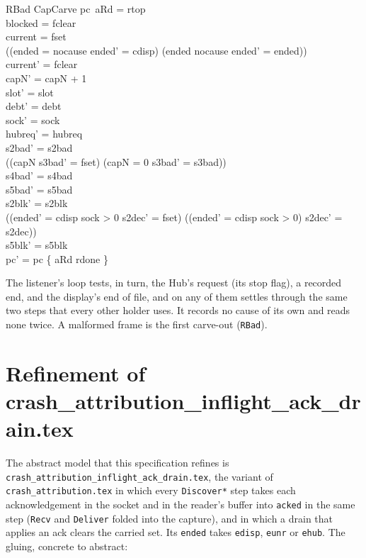 \documentclass[a4paper,10pt,fleqn]{article}
\begin{document}
\begin{schema}{RBad}
  CapCarve
\where
  pc~aRd = rtop \\
  blocked = fclear \\
  current = fset \\
  ((ended = nocause \land ended' = cdisp) \lor (ended \neq nocause \land ended' = ended)) \\
  current' = fclear \\
  capN' = capN + 1 \\
  slot' = slot \\
  debt' = debt \\
  sock' = sock \\
  hubreq' = hubreq \\
  s2bad' = s2bad \\
  ((capN  \land s3bad' = fset) \lor (capN = 0 \land s3bad' = s3bad)) \\
  s4bad' = s4bad \\
  s5bad' = s5bad \\
  s2blk' = s2blk \\
  ((ended' = cdisp \land sock > 0 \land s2dec' = fset) \lor
    (\lnot (ended' = cdisp \land sock > 0) \land s2dec' = s2dec)) \\
  s5blk' = s5blk \\
  pc' = pc \oplus \{ aRd \mapsto rdone \}
\end{schema}

The listener's loop tests, in turn, the Hub's request (its stop flag), a
recorded end, and the display's end of file, and on any of them settles through
the same two steps that every other holder uses.  It records no cause of its
own and reads none twice.  A malformed frame is the first carve-out
(\texttt{RBad}).

\section{Refinement of crash\_attribution\_inflight\_ack\_drain.tex}

The abstract model that this specification refines is
\texttt{crash\_attribution\_inflight\_ack\_drain.tex}, the variant of
\texttt{crash\_attribution.tex} in which every \texttt{Discover*} step takes each
acknowledgement in the socket and in the reader's buffer into \texttt{acked} in
the same step (\texttt{Recv} and \texttt{Deliver} folded into the capture), and
in which a drain that applies an ack clears the carried set.  Its \texttt{ended}
takes \texttt{edisp}, \texttt{eunr} or \texttt{ehub}.  The gluing, concrete to
abstract:
\end{document}
